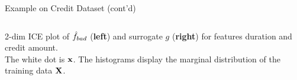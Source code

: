 \documentclass[11pt,compress,t,notes=noshow, aspectratio=169, xcolor=table]{beamer}
\begin{document}
\begin{frame}[c]{Example on Credit Dataset (cont'd)}
\begin{columns}[totalwidth=\textwidth]
\begin{column}{0.46\textwidth}
	\end{column}
\end{columns}
\vspace{-0.4cm}
\begin{center}
		{2-dim ICE plot of $\hat{f}_{bad}$ (\textbf{left}) and surrogate $g$ (\textbf{right}) for features duration and credit amount. \\The white dot is $\mathbf{x}$. The histograms display the marginal distribution of the training data $\mathbf{X}$.}
\end{center}

\end{frame}

%
%
%
\end{document}
